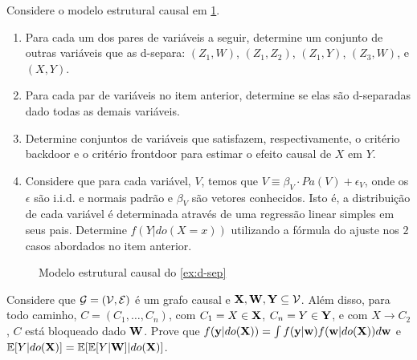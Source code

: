 \begin{exercise}
 \label{ex:d-sep}
 Considere o modelo estrutural causal
 em \cref{fig:d-sep}.
 \begin{enumerate}[label=(\alph*)]
  \item Para cada um dos pares de variáveis a seguir,
  determine um conjunto de outras variáveis que
  as d-separa: $(Z_1,W)$, $(Z_1,Z_2)$, $(Z_1,Y)$, 
  $(Z_3,W)$, e $(X,Y)$.
  \item Para cada par de variáveis no item anterior,
  determine se elas são d-separadas dado
  todas as demais variáveis.
  \item Determine conjuntos de variáveis que
  satisfazem, respectivamente, 
  o critério backdoor e 
  o critério frontdoor para
  estimar o efeito causal de $X$ em $Y$.
  \item Considere que para cada variável, $V$, temos que
  $V \equiv \beta_V \cdot Pa(V) + \epsilon_V$,
  onde os $\epsilon$ são i.i.d. e normais padrão e
  $\beta_V$ são vetores conhecidos. Isto é,
  a distribuição de cada variável é 
  determinada através de 
  uma regressão linear simples em seus pais.
  Determine $f(Y|do(X=x))$ utilizando a fórmula do ajuste
  nos $2$ casos abordados no item anterior.
 \end{enumerate}
\begin{figure}
 \centering
 \caption{Modelo estrutural causal do \cref{ex:d-sep}}
 \label{fig:d-sep}
\end{figure}
\end{exercise}

\begin{exercise}
 Considere que ${\mathcal G} = ({\mathcal V}, {\mathcal E})$ é um grafo causal e
 ${\mathbf{X}},{\mathbf{W}},{\mathbf{Y}} \subseteq {\mathcal V}$. Além disso,
 para todo caminho, $C = (C_1,\ldots,C_n)$,
 com $C_1 = X \in {\mathbf{X}}$, $C_n = Y \in {\mathbf{Y}}$, e
 com $X \rightarrow C_2$,
 $C$ está bloqueado dado ${\mathbf{W}}$.
 Prove que $f({\mathbf{y}}|do({\mathbf{X}})) 
 = \int f({\mathbf{y}}|{\mathbf{w}})f({\mathbf{w}}|do({\mathbf{X}}))d{\mathbf{w}}$ e
 ${\mathbb E}[Y|do({\mathbf{X}})] = {\mathbb E}[{\mathbb E}[Y|{\mathbf{W}}]|do({\mathbf{X}})]$.
\end{exercise}

